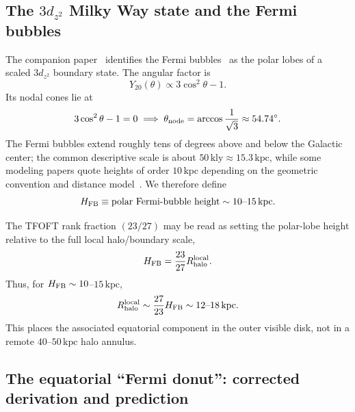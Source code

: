 \documentclass[11pt,a4paper]{article}
\newcommand{\kpc}{\mathrm{kpc}}
\newcommand{\kly}{\mathrm{kly}}
\begin{document}
\subsection{The $3d_{z^2}$ Milky Way state and the Fermi bubbles}

The companion paper~\cite{TFOFT2026} identifies the Fermi
bubbles~\cite{FermiBubbles2010,Ackermann2014} as the polar lobes of a scaled
$3d_{z^2}$ boundary state. The angular factor is
\begin{equation}
  Y_{20}(\theta)\propto3\cos^2\theta-1.
  \label{eq:Y20}
\end{equation}
Its nodal cones lie at
\begin{equation}
  3\cos^2\theta-1=0
  \;\Longrightarrow\;
  \theta_{\rm node}=\arccos\frac{1}{\sqrt3}\approx54.74^\circ.
  \label{eq:nodal_angle}
\end{equation}
The Fermi bubbles extend roughly tens of degrees above and below the Galactic
center; the common descriptive scale is about $50\,\kly\approx15.3\,\kpc$, while
some modeling papers quote heights of order $10\,\kpc$ depending on the
geometric convention and distance model~\cite{FermiBubbles2010,Ackermann2014}.
We therefore define
\begin{equation}
  H_{\rm FB}\equiv\text{polar Fermi-bubble height}\sim10\text{--}15\,\kpc.
  \label{eq:HFB}
\end{equation}


The TFOFT rank fraction $(23/27)$ may be read as setting the polar-lobe height
relative to the full local halo/boundary scale,
\begin{equation}
  H_{\rm FB}=\frac{23}{27}R_{\rm halo}^{\rm local}.
  \label{eq:HFB_rank}
\end{equation}
Thus, for $H_{\rm FB}\sim10$--$15\,\kpc$,
\begin{equation}
  R_{\rm halo}^{\rm local}\sim\frac{27}{23}H_{\rm FB}\sim12\text{--}18\,\kpc.
  \label{eq:Rhalo_local}
\end{equation}
This places the associated equatorial component in the outer visible disk,
not in a remote $40$--$50\,\kpc$ halo annulus.

\subsection{The equatorial ``Fermi donut'': corrected derivation and prediction}
\end{document}
